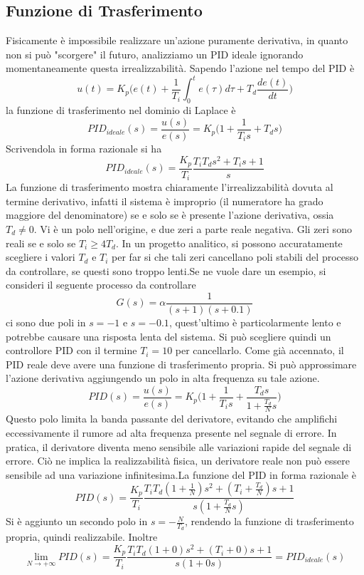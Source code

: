 \documentclass[10pt, letterpaper]{report}
\begin{document}
\subsection{Funzione di Trasferimento}
Fisicamente è impossibile realizzare un'azione puramente derivativa, in quanto non si può "scorgere" il futuro, analizziamo un PID ideale ignorando momentaneamente questa irrealizzabilità. Sapendo l'azione nel tempo del PID è 
$$ 
u(t)=K_p\Big(   e(t)+\frac{1}{T_i}\int_0^te(\tau)d\tau + T_d\frac{de(t)}{dt}    \Big)
$$
la funzione di trasferimento nel dominio di Laplace è 
$$ PID_{ideale}(s)=\frac{u(s)}{e(s)}= 
K_p\Big(1+\frac{1}{T_i s}+T_d s\Big)
$$
Scrivendola in forma razionale si ha 
$$  PID_{ideale}(s)= 
\frac{K_p}{T_i}\frac{T_iT_ds^2+T_is+1}{s}
$$
La funzione di trasferimento mostra chiaramente l'irrealizzabilità dovuta al termine derivativo, infatti il sistema è improprio (il numeratore ha grado maggiore del denominatore) se e solo se è presente l'azione derivativa, ossia $T_d\ne 0$.\acc 
Vi è un polo nell'origine, e due zeri a parte reale negativa. Gli zeri sono reali se e solo se $T_i\ge 4T_d$.\acc 
In un progetto analitico, si possono accuratamente scegliere i valori $T_d$ e $T_i$ per far si che tali zeri cancellano poli stabili del processo da controllare, se questi sono troppo lenti.\acc  Se ne vuole dare un esempio, si consideri il seguente processo da controllare 
$$ G(s)=\alpha\frac{1}{(s+1)(s+0.1)}$$
ci sono due poli in $s=-1$ e $s=-0.1$, quest'ultimo è particolarmente lento e potrebbe causare una risposta lenta del sistema. Si può scegliere quindi un controllore PID con il termine $T_i=10$ per cancellarlo.\acc 
Come già accennato, il PID reale deve avere una funzione di trasferimento propria. Si può approssimare l'azione derivativa aggiungendo un polo in alta frequenza su tale azione. 
$$ PID(s)=\frac{u(s)}{e(s)}= 
K_p\Big(1+\frac{1}{T_i s}+\dfrac{T_d s}{1+\frac{T_d}{N}s}\Big)
$$
Questo polo limita la banda passante del derivatore, evitando che amplifichi eccessivamente il rumore ad alta frequenza presente nel segnale di errore. In pratica, il derivatore diventa meno sensibile alle variazioni rapide del segnale di errore. Ciò ne implica la realizzabilità fisica, un derivatore reale non può essere sensibile ad una variazione infinitesima.\acc  La funzione del PID in forma razionale è 
$$ 
PID(s)=\frac{K_p}{T_i}\frac{T_iT_d(1+\frac{1}{N})s^2+(T_i+\frac{T_d}{N})s+1}{s(1+\frac{T_d}{N}s)}
$$
Si è aggiunto un secondo polo in $s=-\frac{N}{T_d}$, rendendo la funzione di trasferimento propria, quindi realizzabile. Inoltre 
$$ \lim_{N\rightarrow +\infty}PID(s)= 
\frac{K_p}{T_i}\frac{T_iT_d(1+0)s^2+(T_i+0)s+1}{s(1+0s)}
=PID_{ideale}(s)$$
\end{document}
